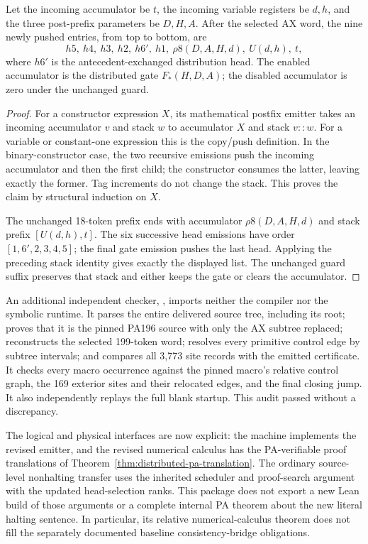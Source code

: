 \begin{lemma}
Let the incoming accumulator be $t$, the incoming variable registers
be $d,h$, and the three post-prefix parameters be $D,H,A$.
After the selected AX word, the nine newly pushed entries, from top
to bottom, are
\[
 h5,\ h4,\ h3,\ h2,\ h6',\ h1,\
 \rho8(D,A,H,d),\ U(d,h),\ t,
\]
where $h6'$ is the antecedent-exchanged distribution head.
The enabled accumulator is the distributed gate $F_*(H,D,A)$;
the disabled accumulator is zero under the unchanged guard.
\end{lemma}
\begin{proof}
For a constructor expression $X$, its mathematical postfix emitter
takes an incoming accumulator $v$ and stack $w$ to accumulator $X$
and stack $v::w$. For a variable or constant-one expression this is
the copy/push definition. In the binary-constructor case, the two
recursive emissions push the incoming accumulator and then the
first child; the constructor consumes the latter, leaving exactly
the former. Tag increments do not change the stack. This proves
the claim by structural induction on $X$.

The unchanged 18-token prefix ends with accumulator
$\rho8(D,A,H,d)$ and stack prefix $[U(d,h),t]$. The six successive
head emissions have order $[1,6',2,3,4,5]$; the final gate emission
pushes the last head. Applying the preceding stack identity gives
exactly the displayed list. The unchanged guard suffix preserves
that stack and either keeps the gate or clears the accumulator.
\end{proof}

An additional independent checker,
, imports neither the compiler
nor the symbolic runtime. It parses the entire delivered source tree,
including its root; proves that it is the pinned PA196 source with only
the AX subtree replaced; reconstructs the selected 199-token word; resolves
every primitive control edge by subtree intervals; and compares all 3,773
site records with the emitted certificate. It checks every macro occurrence
against the pinned macro's relative control graph, the 169 exterior sites
and their relocated edges, and the final closing jump. It also independently
replays the full blank startup. This audit passed without a discrepancy.

The logical and physical interfaces are now explicit: the machine implements
the revised emitter, and the revised numerical calculus has the PA-verifiable
proof translations of Theorem~\ref{thm:distributed-pa-translation}. The
ordinary source-level nonhalting transfer uses the inherited scheduler and
proof-search argument with the updated head-selection ranks. This package
does not export a new Lean build of those arguments or a complete internal
PA theorem about the new literal halting sentence. In particular, its
relative numerical-calculus theorem does not fill the separately documented
baseline consistency-bridge obligations.
